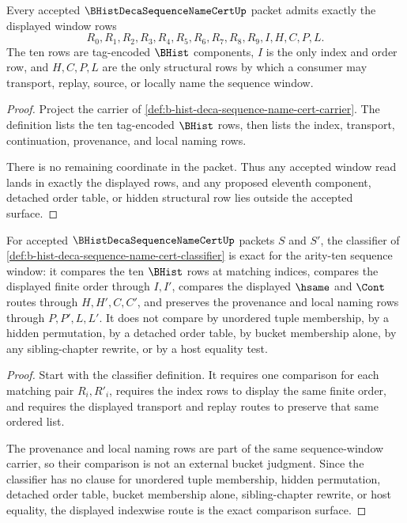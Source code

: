 \begin{theorem}
\label{thm:b-hist-deca-sequence-name-cert-window-admission}
Every accepted $\BHistDecaSequenceNameCertUp$ packet admits exactly the displayed window rows
$$
R_0,R_1,R_2,R_3,R_4,R_5,R_6,R_7,R_8,R_9,I,H,C,P,L.
$$
The ten rows are tag-encoded $\BHist$ components, $I$ is the only index and order row, and $H,C,P,L$ are the only structural rows by which a consumer may transport, replay, source, or locally name the sequence window.
\end{theorem}
\begin{proof}
Project the carrier of \autoref{def:b-hist-deca-sequence-name-cert-carrier}. The definition lists the ten tag-encoded $\BHist$ rows, then lists the index, transport, continuation, provenance, and local naming rows.

There is no remaining coordinate in the packet. Thus any accepted window read lands in exactly the displayed rows, and any proposed eleventh component, detached order table, or hidden structural row lies outside the accepted surface.
\end{proof}

\begin{theorem}
\label{thm:b-hist-deca-sequence-name-cert-classifier-exactness}
For accepted $\BHistDecaSequenceNameCertUp$ packets $S$ and $S'$, the classifier of \autoref{def:b-hist-deca-sequence-name-cert-classifier} is exact for the arity-ten sequence window: it compares the ten $\BHist$ rows at matching indices, compares the displayed finite order through $I,I'$, compares the displayed $\hsame$ and $\Cont$ routes through $H,H',C,C'$, and preserves the provenance and local naming rows through $P,P',L,L'$. It does not compare by unordered tuple membership, by a hidden permutation, by a detached order table, by bucket membership alone, by any sibling-chapter rewrite, or by a host equality test.
\end{theorem}
\begin{proof}
Start with the classifier definition. It requires one comparison for each matching pair $R_i,R'_i$, requires the index rows to display the same finite order, and requires the displayed transport and replay routes to preserve that same ordered list.

The provenance and local naming rows are part of the same sequence-window carrier, so their comparison is not an external bucket judgment. Since the classifier has no clause for unordered tuple membership, hidden permutation, detached order table, bucket membership alone, sibling-chapter rewrite, or host equality, the displayed indexwise route is the exact comparison surface.
\end{proof}

